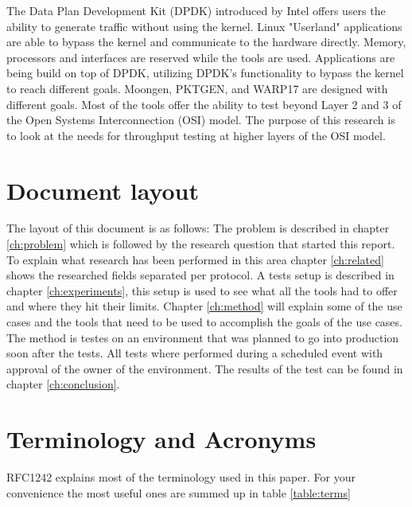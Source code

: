 The Data Plan Development Kit (DPDK) introduced by Intel offers users the ability to generate traffic without using the kernel.  
Linux "Userland" applications are able to bypass the kernel and communicate to the hardware directly. Memory, processors and interfaces are reserved while the tools are used.
Applications are being build on top of DPDK, utilizing DPDK's functionality to bypass the kernel to reach different goals. Moongen, PKTGEN, and WARP17 are designed with different goals. Most of the tools offer the ability to test beyond Layer 2 and 3 of the Open Systems Interconnection (OSI) model. The purpose of this research is to look at the needs for throughput testing at higher layers of the OSI model. \\ 


\section{Document layout}\label{sec:layout}

The layout of this document is as follows: The problem is described in chapter \ref{ch:problem} which is followed by the research question that started this report. To explain what research has been performed in this area chapter \ref{ch:related} shows the researched fields separated per protocol. A tests setup is described in chapter \ref{ch:experiments}, this setup is used to see what all the tools had to offer and where they hit their limits.
Chapter \ref{ch:method} will explain some of the use cases and the tools that need to be used to accomplish the goals of the use cases. The method is testes on an environment that was planned to go into production soon after the tests. All tests where performed during a scheduled event with approval of the owner of the environment. The results of the test can be found in chapter \ref{ch:conclusion}. 
 

\section{Terminology and Acronyms}\label{sec:terminology}
RFC1242 \cite{rfc1242} explains most of the terminology used in this paper. For your convenience the most useful ones are summed up in table \ref{table:terms}

